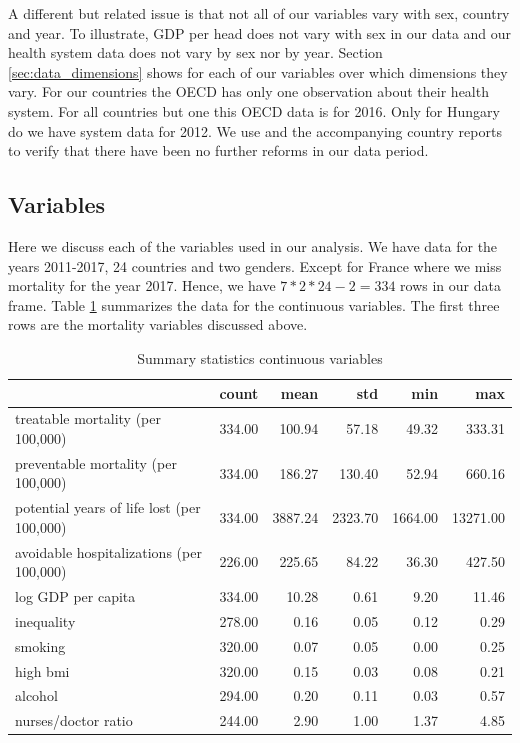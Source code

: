 \documentclass{article}
\begin{document}
A different but related issue is that not all of our variables vary with sex, country and year. To illustrate, GDP per head does not vary with sex in our data and our health system data does not vary by sex nor by year. Section \ref{sec:data_dimensions} shows for each of our variables over which dimensions they vary. For our countries the OECD has only one observation about their health system. For all countries but one this OECD data is for 2016. Only for Hungary do we have system data for 2012. We use \cite{countryprofileReport} and the accompanying country reports to verify that there have been no further reforms in our data period.


\subsection{Variables}
\label{sec:org6b9ce11}

Here we discuss each of the variables used in our analysis. We have data for the years 2011-2017, 24 countries and two genders. Except for France where we miss mortality for the year 2017. Hence, we have \(7*2*24-2=334\) rows in our data frame. Table \ref{tab:org97c867f} summarizes the data for the continuous variables. The first three rows are the mortality variables discussed above.

\begin{table}[htbp]
\caption{\label{tab:org97c867f}Summary statistics continuous variables}
\centering
\begin{tabular}{lrrrrr}
 & count & mean & std & min & max\\
\hline
treatable mortality (per 100,000) & 334.00 & 100.94 & 57.18 & 49.32 & 333.31\\
preventable mortality (per 100,000) & 334.00 & 186.27 & 130.40 & 52.94 & 660.16\\
potential years of life lost (per 100,000) & 334.00 & 3887.24 & 2323.70 & 1664.00 & 13271.00\\
avoidable hospitalizations (per 100,000) & 226.00 & 225.65 & 84.22 & 36.30 & 427.50\\
log GDP per capita & 334.00 & 10.28 & 0.61 & 9.20 & 11.46\\
inequality & 278.00 & 0.16 & 0.05 & 0.12 & 0.29\\
smoking & 320.00 & 0.07 & 0.05 & 0.00 & 0.25\\
high bmi & 320.00 & 0.15 & 0.03 & 0.08 & 0.21\\
alcohol & 294.00 & 0.20 & 0.11 & 0.03 & 0.57\\
nurses/doctor ratio & 244.00 & 2.90 & 1.00 & 1.37 & 4.85\\
\end{tabular}
\end{table}
\end{document}
